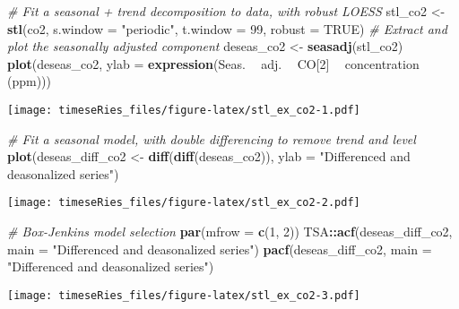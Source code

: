 \documentclass[]{book}
\newenvironment{Shaded}{\begin{snugshade}}{\end{snugshade}}
\newcommand{\CommentTok}[1]{\textcolor[rgb]{0.56,0.35,0.01}{\textit{#1}}}
\newcommand{\DataTypeTok}[1]{\textcolor[rgb]{0.13,0.29,0.53}{#1}}
\newcommand{\DecValTok}[1]{\textcolor[rgb]{0.00,0.00,0.81}{#1}}
\newcommand{\KeywordTok}[1]{\textcolor[rgb]{0.13,0.29,0.53}{\textbf{#1}}}
\newcommand{\NormalTok}[1]{#1}
\newcommand{\OperatorTok}[1]{\textcolor[rgb]{0.81,0.36,0.00}{\textbf{#1}}}
\newcommand{\OtherTok}[1]{\textcolor[rgb]{0.56,0.35,0.01}{#1}}
\newcommand{\StringTok}[1]{\textcolor[rgb]{0.31,0.60,0.02}{#1}}
\begin{document}
\begin{Shaded}
\begin{Highlighting}[]
\CommentTok{# Fit a seasonal + trend decomposition to data, with robust LOESS}
\NormalTok{stl_co2 <-}\StringTok{ }\KeywordTok{stl}\NormalTok{(co2, }\DataTypeTok{s.window =} \StringTok{"periodic"}\NormalTok{, }\DataTypeTok{t.window =} \DecValTok{99}\NormalTok{, }\DataTypeTok{robust =} \OtherTok{TRUE}\NormalTok{)}
\CommentTok{# Extract and plot the seasonally adjusted component}
\NormalTok{deseas_co2 <-}\StringTok{ }\KeywordTok{seasadj}\NormalTok{(stl_co2)}
\KeywordTok{plot}\NormalTok{(deseas_co2, }\DataTypeTok{ylab =} \KeywordTok{expression}\NormalTok{(Seas. }\OperatorTok{~}\StringTok{ }\NormalTok{adj. }\OperatorTok{~}\StringTok{ }\NormalTok{CO[}\DecValTok{2}\NormalTok{] }\OperatorTok{~}\StringTok{ }\NormalTok{concentration }\OperatorTok{~}\StringTok{ }\NormalTok{(ppm)))}
\end{Highlighting}
\end{Shaded}

\texttt{[image: timeseRies\_files/figure-latex/stl\_ex\_co2-1.pdf]}

\begin{Shaded}
\begin{Highlighting}[]
\CommentTok{# Fit a seasonal model, with double differencing to remove trend and level}
\KeywordTok{plot}\NormalTok{(deseas_diff_co2 <-}\StringTok{ }\KeywordTok{diff}\NormalTok{(}\KeywordTok{diff}\NormalTok{(deseas_co2)), }\DataTypeTok{ylab =} \StringTok{"Differenced and deasonalized series"}\NormalTok{)}
\end{Highlighting}
\end{Shaded}

\texttt{[image: timeseRies\_files/figure-latex/stl\_ex\_co2-2.pdf]}

\begin{Shaded}
\begin{Highlighting}[]
\CommentTok{# Box-Jenkins model selection}
\KeywordTok{par}\NormalTok{(}\DataTypeTok{mfrow =} \KeywordTok{c}\NormalTok{(}\DecValTok{1}\NormalTok{, }\DecValTok{2}\NormalTok{))}
\NormalTok{TSA}\OperatorTok{::}\KeywordTok{acf}\NormalTok{(deseas_diff_co2, }\DataTypeTok{main =} \StringTok{"Differenced and deasonalized series"}\NormalTok{)}
\KeywordTok{pacf}\NormalTok{(deseas_diff_co2, }\DataTypeTok{main =} \StringTok{"Differenced and deasonalized series"}\NormalTok{)}
\end{Highlighting}
\end{Shaded}

\texttt{[image: timeseRies\_files/figure-latex/stl\_ex\_co2-3.pdf]}
\end{document}
